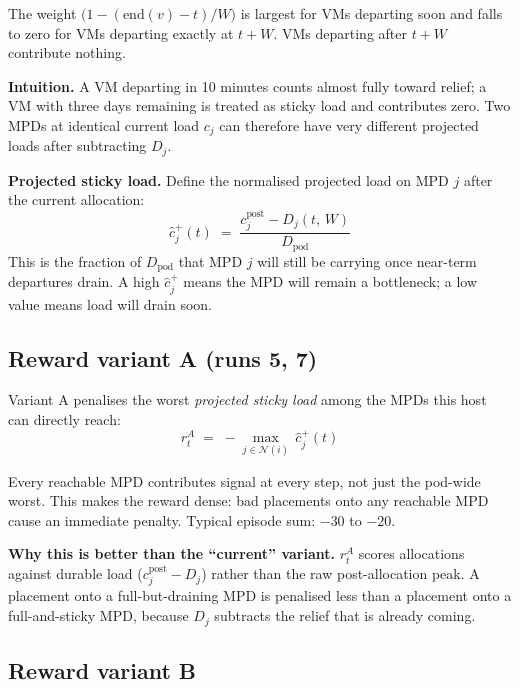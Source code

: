\documentclass[11pt]{article}
\begin{document}
The weight $\bigl(1 - (\text{end}(v)-t)/W\bigr)$ is largest for VMs departing
soon and falls to zero for VMs departing exactly at $t+W$.
VMs departing after $t + W$ contribute nothing.

\medskip
\noindent\textbf{Intuition.}
A VM departing in 10 minutes counts almost fully toward relief;
a VM with three days remaining is treated as sticky load and contributes zero.
Two MPDs at identical current load $c_j$ can therefore have very different
projected loads after subtracting $D_j$.

\medskip
\noindent\textbf{Projected sticky load.}
Define the normalised projected load on MPD $j$ after the current allocation:
\begin{equation}
  \hat{c}_j^+(t)
  \;=\;
  \frac{c_j^{\text{post}} - D_j(t,\,W)}{D_{\text{pod}}}
  \label{eq:chat_plus}
\end{equation}
This is the fraction of $D_{\text{pod}}$ that MPD $j$ will still be carrying
once near-term departures drain.  A high $\hat{c}_j^+$ means the MPD will
remain a bottleneck; a low value means load will drain soon.

\subsection*{Reward variant A (runs 5, 7)}

Variant A penalises the worst \emph{projected sticky load} among the MPDs
this host can directly reach:
\begin{equation}
  r_t^A
  \;=\;
  -\max_{j \in \mathcal{N}(i)}\,\hat{c}_j^+(t)
  \label{eq:reward_A}
\end{equation}

Every reachable MPD contributes signal at every step, not just the pod-wide
worst.  This makes the reward dense: bad placements onto any reachable MPD
cause an immediate penalty.  Typical episode sum: $-30$ to $-20$.

\medskip
\noindent\textbf{Why this is better than the ``current'' variant.}
$r_t^A$ scores allocations against durable load ($c_j^{\text{post}} - D_j$)
rather than the raw post-allocation peak.  A placement onto a full-but-draining
MPD is penalised less than a placement onto a full-and-sticky MPD, because
$D_j$ subtracts the relief that is already coming.

\subsection*{Reward variant B}
\end{document}
